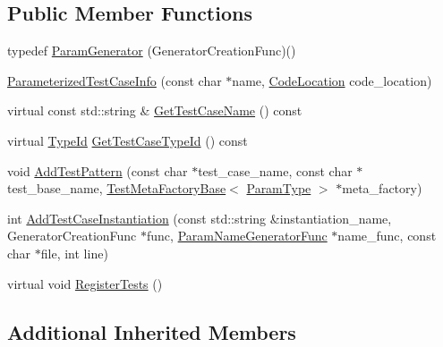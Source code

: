 \subsection*{Public Member Functions}
\begin{DoxyCompactItemize}
\item 
typedef \mbox{\hyperlink{classtesting_1_1internal_1_1ParameterizedTestCaseInfo_a2f6a423f7ae8c7ac24b468538693aa26}{Param\+Generator}} (Generator\+Creation\+Func)()
\item 
\mbox{\hyperlink{classtesting_1_1internal_1_1ParameterizedTestCaseInfo_a6d19f368428260bd5c6e608b4d3fc6af}{Parameterized\+Test\+Case\+Info}} (const char $\ast$name, \mbox{\hyperlink{structtesting_1_1internal_1_1CodeLocation}{Code\+Location}} code\+\_\+location)
\item 
virtual const std\+::string \& \mbox{\hyperlink{classtesting_1_1internal_1_1ParameterizedTestCaseInfo_a8a9eafc7654b154165f131974397e200}{Get\+Test\+Case\+Name}} () const
\item 
virtual \mbox{\hyperlink{namespacetesting_1_1internal_ab1114197d3c657d8b7f8e0c5caa12d00}{Type\+Id}} \mbox{\hyperlink{classtesting_1_1internal_1_1ParameterizedTestCaseInfo_a16ed77e95a6042c722d0029744acfc33}{Get\+Test\+Case\+Type\+Id}} () const
\item 
void \mbox{\hyperlink{classtesting_1_1internal_1_1ParameterizedTestCaseInfo_a3e557c888ec5e23b138c2ff254db15e5}{Add\+Test\+Pattern}} (const char $\ast$test\+\_\+case\+\_\+name, const char $\ast$test\+\_\+base\+\_\+name, \mbox{\hyperlink{classtesting_1_1internal_1_1TestMetaFactoryBase}{Test\+Meta\+Factory\+Base}}$<$ \mbox{\hyperlink{classtesting_1_1internal_1_1ParameterizedTestCaseInfo_a643a87e178bf92a4246ce21054e44b96}{Param\+Type}} $>$ $\ast$meta\+\_\+factory)
\item 
int \mbox{\hyperlink{classtesting_1_1internal_1_1ParameterizedTestCaseInfo_adefded091e3f20ac3a758029caea3eab}{Add\+Test\+Case\+Instantiation}} (const std\+::string \&instantiation\+\_\+name, Generator\+Creation\+Func $\ast$func, \mbox{\hyperlink{classtesting_1_1internal_1_1ParameterizedTestCaseInfo_aed6c5184cb8f94cec73e9d7c4b7fa2ce}{Param\+Name\+Generator\+Func}} $\ast$name\+\_\+func, const char $\ast$file, int line)
\item 
virtual void \mbox{\hyperlink{classtesting_1_1internal_1_1ParameterizedTestCaseInfo_a7e118820b3074ce70c0440e2e49a50a1}{Register\+Tests}} ()
\end{DoxyCompactItemize}
\subsection*{Additional Inherited Members}


